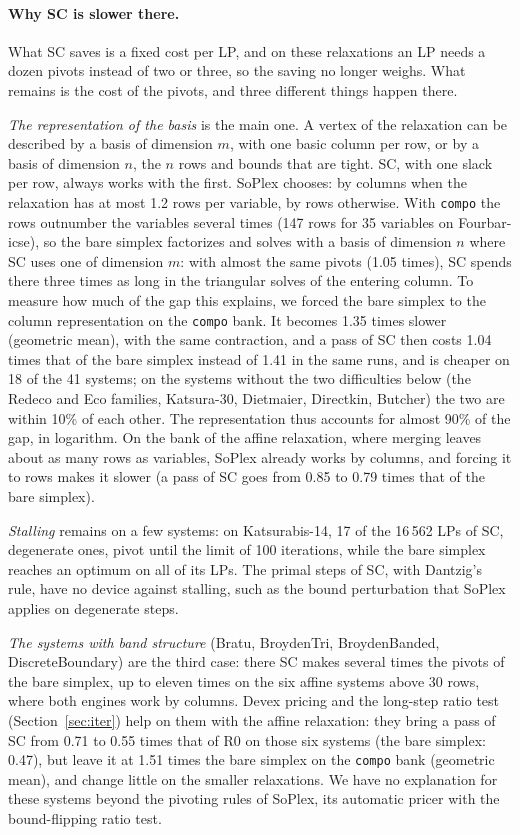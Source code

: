 \documentclass[11pt]{article}
\theoremstyle{definition}
\theoremstyle{remark}
\begin{document}
\paragraph{Why SC is slower there.}
What SC saves is a fixed cost per LP, and on these relaxations an LP needs a
dozen pivots instead of two or three, so the saving no longer weighs. What
remains is the cost of the pivots, and three different things happen there.

\emph{The representation of the basis} is the main one. A vertex of the
relaxation can be described by a basis of dimension $m$, with one basic column
per row, or by a basis of dimension $n$, the $n$ rows and bounds that are
tight. SC, with one slack per row, always works with the first. SoPlex
chooses: by columns when the relaxation has at most 1.2 rows per variable, by
rows otherwise. With \texttt{compo} the rows outnumber the variables several
times (147 rows for 35 variables on Fourbar-icse), so the bare simplex
factorizes and solves with a basis of dimension $n$ where SC uses one of
dimension $m$: with almost the same pivots (1.05 times), SC spends there three
times as long in the triangular solves of the entering column. To measure how
much of the gap this explains, we forced the bare simplex to the column
representation on the \texttt{compo} bank. It becomes 1.35 times slower
(geometric mean), with the same contraction, and a pass of SC then costs 1.04
times that of the bare simplex instead of 1.41 in the same runs, and is cheaper on 18 of the 41
systems; on the systems without the two difficulties below (the
Redeco and Eco families, Katsura-30, Dietmaier, Directkin, Butcher) the two are
within 10\% of each other. The representation thus accounts for almost 90\%
of the gap, in logarithm. On the bank of the affine relaxation, where
merging leaves about as many rows as variables, SoPlex already works by
columns, and forcing it to rows makes it slower (a pass of SC goes from 0.85
to 0.79 times that of the bare simplex).

\emph{Stalling} remains on a few systems: on Katsurabis-14, 17 of the
16\,562 LPs of SC, degenerate ones, pivot until the limit of 100 iterations,
while the bare simplex reaches an optimum on all of its LPs. The primal steps
of SC, with Dantzig's rule, have no device against stalling, such as the
bound perturbation that SoPlex applies on degenerate steps.

\emph{The systems with band structure} (Bratu, BroydenTri, BroydenBanded,
DiscreteBoundary) are the third case: there SC makes several times the pivots
of the bare simplex, up to eleven times on the six affine systems above 30
rows, where both engines work by columns. Devex pricing and the long-step ratio
test (Section~\ref{sec:iter}) help on them with the affine relaxation: they
bring a pass of SC from 0.71 to 0.55 times that of R0 on those six systems
(the bare simplex: 0.47), but leave it at 1.51 times the bare simplex on the
\texttt{compo} bank (geometric mean), and change little on the smaller
relaxations. We have no explanation for these systems beyond the pivoting
rules of SoPlex, its automatic pricer with the bound-flipping ratio test.
\end{document}
